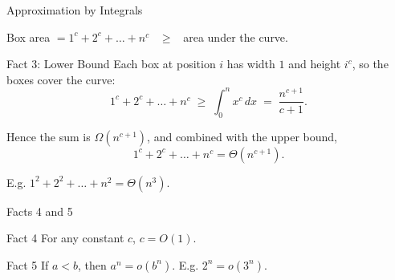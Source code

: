 \documentclass[10pt,aspectratio=169]{beamer}
\begin{document}
\begin{frame}{Approximation by Integrals}
  \begin{center}
  \end{center}

  \begin{center}
    \small Box area $= 1^c + 2^c + \ldots + n^c$ \ $\ge$ \ area under the curve.
  \end{center}
\end{frame}

\begin{frame}{Fact 3: Lower Bound}
  Each box at position $i$ has width $1$ and height $i^c$, so the boxes cover the curve:
  \[
    1^c + 2^c + \ldots + n^c
    \;\ge\; \int_0^n x^c \, dx
    \;=\; \frac{n^{c+1}}{c+1}.
  \]

  \bigskip
  Hence the sum is $\Omega(n^{c+1})$, and combined with the upper bound,
  \[
    1^c + 2^c + \ldots + n^c = \Theta(n^{c+1}).
  \]

  \bigskip
  \begin{center}
    \small E.g. $1^2 + 2^2 + \ldots + n^2 = \Theta(n^3)$.
  \end{center}
\end{frame}

\begin{frame}{Facts 4 and 5}
  \begin{block}{Fact 4}
    For any constant $c$, \quad $c = O(1)$.
  \end{block}

  \bigskip
  \begin{block}{Fact 5}
    If $a < b$, then $a^n = o(b^n)$. \quad E.g. $2^n = o(3^n)$.
  \end{block}
\end{frame}
\end{document}
